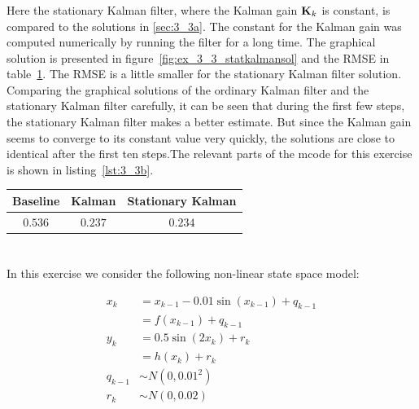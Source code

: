 \documentclass[a4paper,oneside,article]{memoir}
\newcommand{\otoprule}{\midrule[\heavyrulewidth]}
\begin{document}



\subsubsection{\label{sec:3_3b}}

Here the stationary Kalman filter, where the Kalman gain $\mathbf{K}_k$ is constant,
is compared to the solutions in \ref{sec:3_3a}. The constant for the Kalman gain
was computed numerically by running the filter for a long time. The graphical
solution is presented in figure~\ref{fig:ex_3_3_statkalmansol} and the RMSE in
table~\ref{table:rmse3.3a}. The RMSE is a little smaller for the stationary
Kalman filter solution. Comparing the graphical solutions of the
ordinary Kalman filter and the stationary Kalman filter carefully, it can be
seen that during the first few steps, the stationary Kalman filter makes a
better estimate. But since the Kalman gain seems to converge to its constant
value very quickly, the solutions are close to identical after the first ten
steps.The relevant
parts of the mcode for this exercise is shown in listing~\ref{lst:3_3b}.





\begin{table}[h]
	\centering
	\begin{tabular}{c c c}
		\otoprule
		Baseline & Kalman & Stationary Kalman\\
		\midrule
		$0.536$ & $0.237$ & $0.234$\\
		\bottomrule
	\end{tabular}
	\label{table:rmse3.3a}
\end{table}

\section{}
\subsection{}\label{sec:4_1}
In this exercise we consider the following non-linear state space model:

\begin{align}
	x_k&=x_{k-1}-0.01\sin(x_{k-1})+q_{k-1}\\
	&=f(x_{k-1})+q_{k-1}\\
	y_k&=0.5\sin(2x_k)+r_k\\
	&=h(x_{k})+r_{k}\\
	q_{k-1} &\sim N\left(0,0.01^2\right)\\
	r_{k} &\sim N\left(0,0.02 \right)
\end{align}
\end{document}
